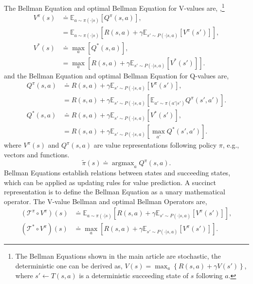 \documentclass{article} %
\DeclareMathOperator*{\argmax}{argmax}
\newcommand{\bellman}{\mathcal{T}^\pi}
\newcommand{\bellmanopt}{\mathcal{T}^*}
\begin{document}
The Bellman Equation and optimal Bellman Equation for V-values are, \cite{sutton2018reinforcement},\footnote{The Bellman Equations shown in the main article are stochastic, the deterministic one can be derived as, $V(s) = \max_{a} \left\{ R(s, a) + \gamma V(s')\right\}$, where $s'\gets T(s,a)$ is a deterministic succeeding state of $s$ following $a$.}
\begin{equation}
	\begin{aligned}
	V^\pi(s) &\doteq \mathbb{E}_{a \sim \pi(\cdot|s)} \left[ Q^\pi(s, a) \right], \\
    &= \mathbb{E}_{a \sim \pi(\cdot|s)} \left[ R(s, a) + \gamma \mathbb{E}_{s' \sim P(\cdot|s,a)} \left[V^\pi(s')\right] \right],  \\
	V^*(s) &\doteq \max_{a} \left[ Q^*(s, a) \right], \\
    &= \max_{a} \left[ R(s, a) + \gamma \mathbb{E}_{s' \sim P(\cdot|s,a)} \left[V^*(s')\right] \right].
\end{aligned}
\end{equation}
and the Bellman Equation and optimal Bellman Equation for Q-values are,
\begin{equation}
	\begin{aligned}
    Q^\pi(s, a) &\doteq R(s, a) + \gamma \mathbb{E}_{s'\sim P(\cdot|s,a)} \left[V^\pi(s')\right], \\
    &= R(s, a) + \gamma \mathbb{E}_{s'\sim P(\cdot|s,a)} \left[\mathbb{E}_{a'\sim\pi(a'|s')} Q^\pi(s', a')\right]. \\
    Q^*(s, a) &\doteq R(s, a) + \gamma \mathbb{E}_{s'\sim P(\cdot|s,a)} \left[V^*(s')\right], \\
    &= R(s, a) + \gamma \mathbb{E}_{s'\sim P(\cdot|s,a)} \left[\max_{a'} Q^*(s', a')\right]. 
\end{aligned}
\end{equation}
where $V^\pi(s)$ and $Q^\pi(s,a)$ are value representations following policy $\pi$, e.g., vectors and functions.
\begin{equation}
	\tilde{\pi}(s) \doteq \argmax_a Q^\pi (s,a).
\end{equation}
Bellman Equations establish relations between states and succeeding states, which can be applied as updating rules for value prediction. A succinct representation is to define the Bellman Equation as a unary mathematical operator. The V-value Bellman and optimal Bellman Operators are,
\begin{equation}
	\begin{aligned}
    (\bellman \circ V^\pi)(s) &\doteq \mathbb{E}_{a \sim \pi(\cdot|s)} \left[ R(s, a) + \gamma \mathbb{E}_{s' \sim P(\cdot|s,a)} \left[V^\pi(s')\right] \right], \\
    (\bellmanopt \circ V^\pi)(s) &\doteq \max_a \left[ R(s, a) + \gamma \mathbb{E}_{s' \sim P(\cdot|s,a)} \left[V^\pi(s')\right] \right]. 
\end{aligned}
\end{equation}
\end{document}
